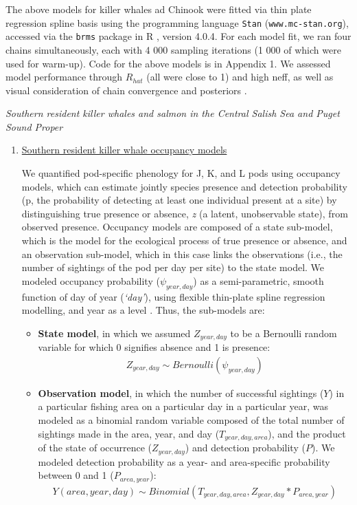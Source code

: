 \documentclass{article}
\begin{document}
The above models for killer whales ad Chinook were fitted via thin plate regression spline basis using the programming language \texttt{Stan} \citep{Carpenter:2016aa} (\texttt{www.mc-stan.org}), accessed via the \texttt{brms}\citep{brms2018} package in R \citep{Rcore2021}, version 4.0.4. For each model fit, we ran four chains simultaneously, each with 4 000 sampling iterations (1 000 of which were used for warm-up). Code for the above models is in Appendix 1. We assessed model performance through $R_{hat}$ (all were close to 1) and high neff, as well as visual consideration of chain convergence and posteriors \citep{BDA}.
\par \emph{Southern resident killer whales and salmon in the Central Salish Sea and Puget Sound Proper}
\begin{enumerate}
\item \underline {Southern resident killer whale occupancy models}
\par We quantified pod-specific phenology for J, K, and L pods using occupancy models, which can estimate jointly species presence and detection probability (p, the probability of detecting at least one individual present at a site) by distinguishing true presence or absence, \emph{z} (a latent, unobservable state), from observed presence. Occupancy models are composed of a state sub-model, which is the model for the ecological process of true presence or absence, and an observation sub-model, which in this case links the observations (i.e., the number of sightings of the pod per day per site) to the state model. We modeled occupancy probability ($\psi_{year,day}$) as a semi-parametric, smooth function of day of year (\emph{`day'}), using flexible thin-plate spline regression modelling, and year as a level \citep{strebel2014}. Thus, the sub-models are:
\begin{itemize}

\item \textbf{State model}, in which we assumed $Z_{year,day}$ to be a Bernoulli random variable for which 0 signifies absence and 1 is presence:
 \begin{align*}
Z_{year,day} \sim Bernoulli (\psi_{year,day})
\end{align*}
  \item \textbf{Observation model}, in which the number of successful sightings ($Y$) in a particular fishing area on a particular day in a particular year, was modeled as a binomial random variable composed of the total number of sightings made in the area, year, and day ($T_{year,day,area}$), and the product of the state of occurrence ($Z_{year,day}$) and detection probability ($P$). We modeled detection probability as a year- and area-specific probability between 0 and 1 ($P_{area,year}$):
\begin{align*}
Y(area,year,day) \sim Binomial (T_{year, day,area},Z_{year,day}*P_{area,year})
\end{align*}
                                                                             \end{itemize}                                                       


\end{enumerate}
\end{document}
